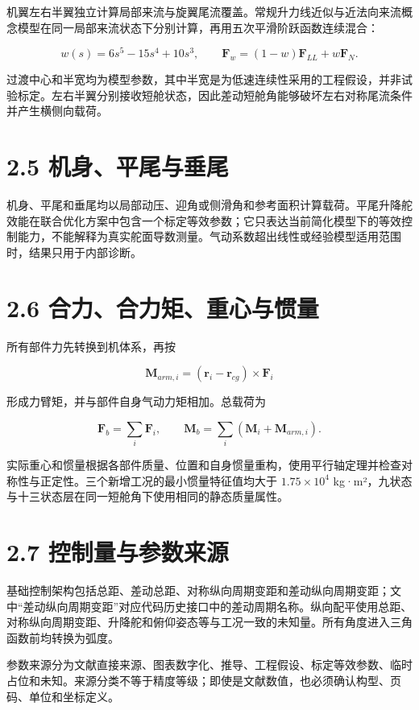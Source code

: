 \documentclass[UTF8,12pt,openany]{ctexbook}
\begin{document}
机翼左右半翼独立计算局部来流与旋翼尾流覆盖。常规升力线近似与近法向来流概念模型在同一局部来流状态下分别计算，再用五次平滑阶跃函数连续混合：

$$w(s)=6s^5-15s^4+10s^3,\qquad
\mathbf{F}_w=(1-w)\mathbf{F}_{LL}+w\mathbf{F}_{N}.$$

过渡中心和半宽均为模型参数，其中半宽是为低速连续性采用的工程假设，并非试验标定。左右半翼分别接收短舱状态，因此差动短舱角能够破坏左右对称尾流条件并产生横侧向载荷。

\section{2.5 机身、平尾与垂尾}

机身、平尾和垂尾均以局部动压、迎角或侧滑角和参考面积计算载荷。平尾升降舵效能在联合优化方案中包含一个标定等效参数；它只表达当前简化模型下的等效控制能力，不能解释为真实舵面导数测量。气动系数超出线性或经验模型适用范围时，结果只用于内部诊断。

\section{2.6 合力、合力矩、重心与惯量}

所有部件力先转换到机体系，再按

$$\mathbf{M}_{arm,i}=(\mathbf{r}_i-\mathbf{r}_{cg})\times\mathbf{F}_i$$

形成力臂矩，并与部件自身气动力矩相加。总载荷为

$$\mathbf{F}_b=\sum_i\mathbf{F}_i,\qquad
\mathbf{M}_b=\sum_i(\mathbf{M}_i+\mathbf{M}_{arm,i}).$$

实际重心和惯量根据各部件质量、位置和自身惯量重构，使用平行轴定理并检查对称性与正定性。三个新增工况的最小惯量特征值均大于 $1.75\times10^4$ kg·m²，九状态与十三状态层在同一短舱角下使用相同的静态质量属性。

\section{2.7 控制量与参数来源}

基础控制架构包括总距、差动总距、对称纵向周期变距和差动纵向周期变距；文中“差动纵向周期变距”对应代码历史接口中的差动周期名称。纵向配平使用总距、对称纵向周期变距、升降舵和俯仰姿态等与工况一致的未知量。所有角度进入三角函数前均转换为弧度。

参数来源分为文献直接来源、图表数字化、推导、工程假设、标定等效参数、临时占位和未知。来源分类不等于精度等级；即使是文献数值，也必须确认构型、页码、单位和坐标定义。
\end{document}
